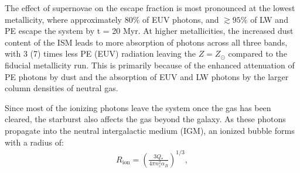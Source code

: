 \documentclass[twocolumn,linenumbers]{aastex631}
\begin{document}
The effect of supernovae on the escape fraction is most pronounced at the lowest metallicity, where approximately $80\%$ of EUV photons, and $\gtrsim 95\%$ of LW and PE escape the system by t = 20 Myr. At higher metallicities, the increased dust content of the ISM leads to more absorption of photons across all three bands, with $3$ (7) times less PE (EUV) radiation leaving the $Z=Z_\odot$ compared to the fiducial metallicity run. This is primarily because of the enhanced attenuation of PE photons by dust and the absorption of EUV and LW photons by the larger column densities of neutral gas.

Since most of the ionizing photons leave the system once the gas has been cleared, the starburst also affects the gas beyond the galaxy. As these photons propagate into the neutral intergalactic medium (IGM), an ionized bubble forms with a radius of:
\begin{align}
    R_\mathrm{ion} = \left(\frac{3Q_*}{4\pi n_z^2 \alpha_B}\right)^{1/3}, \label{eq:bubble_eq}
\end{align}
\end{document}
